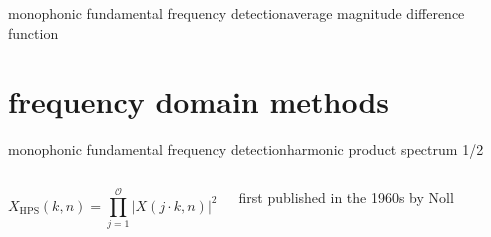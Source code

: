 	\begin{frame}{monophonic fundamental frequency detection}{average magnitude difference function}
	\end{frame}
	
    \section[frequency domain]{frequency domain methods}
	\begin{frame}{monophonic fundamental frequency detection}{harmonic product spectrum 1/2}
        \vspace{-12mm}
        \begin{columns}
                \vspace{4mm}
                \begin{equation*}\label{eq:hps}
                    X_{\mathrm{HPS}}(k,n) = \prod\limits_{j=1}^{\mathcal{O}}{|X(j\cdot k,n)|^2}
                \end{equation*}
                
                first published in the 1960s by Noll
		\end{columns}
        \vspace{-5mm}
	\end{frame}
	
